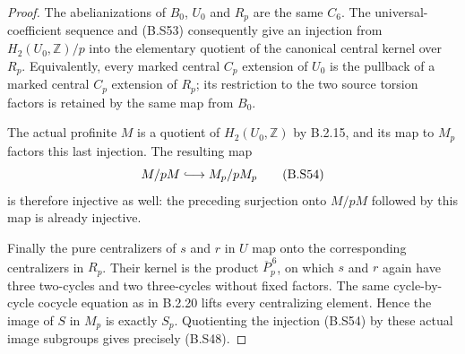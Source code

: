 \begin{proof}
The abelianizations of $B_0$, $U_0$ and $R_p$ are
the same $C_6$.  The universal-coefficient sequence
and (B.S53) consequently give an injection from
$H_2(U_0,\mathbb Z)/p$ into the elementary quotient
of the canonical central kernel over $R_p$.
Equivalently, every marked central $C_p$ extension
of $U_0$ is the pullback of a marked central
$C_p$ extension of $R_p$; its restriction to the
two source torsion factors is retained by the
same map from $B_0$.

The actual profinite $M$ is a quotient of
$H_2(U_0,\mathbb Z)$ by B.2.15, and its map to
$M_p$ factors this last injection.  The resulting
map
\[
                         M/pM\lhook\joinrel\longrightarrow M_p/pM_p
                                                                  \tag{B.S54}
\]
is therefore injective as well: the preceding
surjection onto $M/pM$ followed by this map is
already injective.

Finally the pure centralizers of $s$ and $r$ in
$U$ map onto the corresponding centralizers in
$R_p$.  Their kernel is the product
$\overline P_p^{\,6}$, on which $s$ and $r$ again
have three two-cycles and two three-cycles without
fixed factors.  The same cycle-by-cycle cocycle
equation as in B.2.20 lifts every centralizing
element.  Hence the image of $S$ in $M_p$ is
exactly $S_p$.  Quotienting the injection (B.S54)
by these actual image subgroups gives precisely
(B.S48).
\end{proof}
